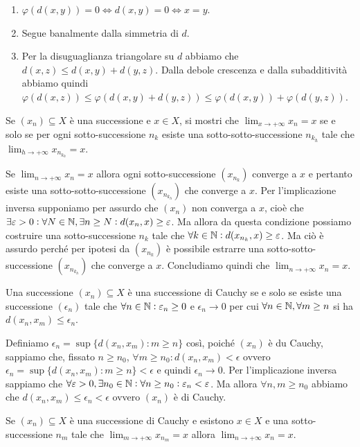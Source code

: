 \documentclass[a4paper]{article}\par \usepackage{style}\par
\begin{document}
\begin{enumerate}[label = (\roman*)]
\item $ \varphi\left(d(x, y)\right) = 0 \iff d(x, y) = 0 \iff x = y $.
\item Segue banalmente dalla simmetria di $ d $.
\item Per la disuguaglianza triangolare su $ d $ abbiamo che $ d(x, z) \leq d(x, y) + d(y, z) $. Dalla debole crescenza e dalla subadditività abbiamo quindi $ \varphi\left(d(x, z)\right) \leq \varphi\left(d(x, y) + d(y, z)\right) \leq \varphi\left(d(x, y)\right) + \varphi\left(d(y, z)\right) $.
\end{enumerate}\par \begin{es}
  Se $ (x_n) \subseteq X $ è una successione e $ x \in X $, si mostri che $ \lim_{x \to +\infty} x_n = x $ se e solo se per ogni sotto-successione $ n_k $ esiste una sotto-sotto-successione $ n_{k_h} $ tale che $ \lim_{h \to +\infty} x_{n_{k_h}} = x $.
\end{es}\par Se $ \lim_{n \to +\infty} x_n = x $ allora ogni sotto-successione $ (x_{n_k}) $ converge a $ x $ e pertanto esiste una sotto-sotto-successione $ (x_{n_{k_h}}) $ che converge a $ x $. Per l'implicazione inversa supponiamo per assurdo che $ (x_n) $ non converga a $ x $, cioè che $ \exists \varepsilon > 0 : \forall N \in \mathbb{N}, \exists n \geq N : d(x_n, x) \geq \varepsilon $. Ma allora da questa condizione possiamo costruire una sotto-successione $ n_k $ tale che $ \forall k \in \mathbb{N} : d(x_{n_k}, x) \geq \varepsilon $. Ma ciò è assurdo perché per ipotesi da $ (x_{n_k}) $ è possibile estrarre una sotto-sotto-successione $ (x_{n_{k_h}}) $ che converge a $ x $. Concludiamo quindi che $ \lim_{n \to +\infty} x_n = x $.\par \begin{es}
  Una successione $ (x_n) \subseteq X $ è una successione di Cauchy se e solo se esiste una successione $ (\epsilon_n) $ tale che $ \forall n \in \mathbb{N} : \varepsilon_n \geq 0 $ e $ \epsilon_n \to 0 $ per cui $ \forall n \in \mathbb{N}, \forall m \geq n $ si ha $ d(x_n, x_m) \leq \epsilon_n $.
\end{es}\par Definiamo $ \epsilon_n = \sup{\{d(x_n, x_m) : m \geq n\}} $ così, poiché $ (x_n) $ è du Cauchy, sappiamo che, fissato $ n \geq n_0 $, $ \forall m \geq n_0 : d(x_n, x_m) < \epsilon $ ovvero $ \epsilon_n = \sup{\{d(x_n, x_m) : m \geq n\}} < \epsilon $ e quindi $ \epsilon_n \to 0 $. Per l'implicazione inversa sappiamo che $ \forall \varepsilon > 0, \exists n_0 \in \mathbb{N} : \forall n \geq n_0 : \varepsilon_n < \varepsilon $. Ma allora $ \forall n, m \geq n_0 $ abbiamo che $ d(x_n, x_m) \leq \epsilon_n < \epsilon $ ovvero $ (x_n) $ è di Cauchy.\par \begin{es}
  Se $ (x_n) \subseteq X $ è una successione di Cauchy e esistono $ x \in X $ e una sotto-successione $ n_m $ tale che $ \lim_{m \to +\infty} x_{n_m} = x $ allora $ \lim_{n \to +\infty} x_n = x $.
\end{es}
\end{document}
